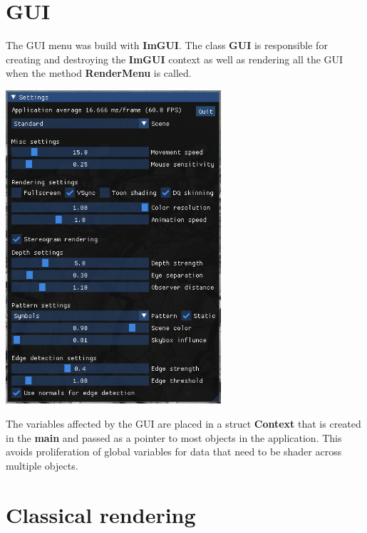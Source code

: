 \documentclass[12pt, a4paper]{article}
\begin{document}
\section{GUI}
The GUI menu was build with \textbf{ImGUI}. The class \textbf{GUI} is responsible for creating and destroying the
\textbf{ImGUI} context as well as rendering all the GUI when the method \textbf{RenderMenu} is called.
\begin{center}
    \centering
    \includegraphics[width=0.6\textwidth]{img/gui.png}
\end{center}
The variables affected by the GUI are placed in a struct \textbf{Context} that is created in the \textbf{main} and
passed as a pointer to most objects in the application. This avoids proliferation of global variables for data 
that need to be shader across multiple objects.

\section{Classical rendering}
\end{document}
